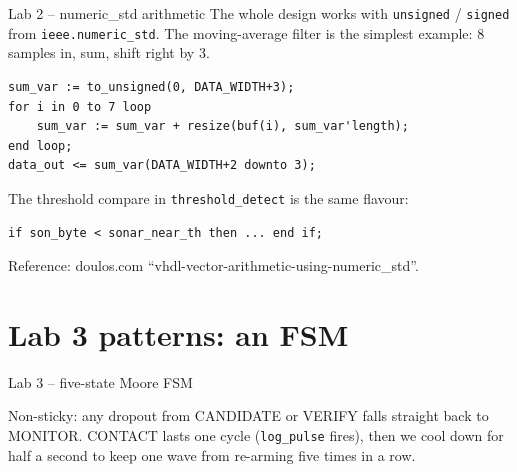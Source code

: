 \documentclass[aspectratio=169,10pt]{beamer}
\begin{document}
\begin{frame}[fragile]{Lab 2 -- numeric\_std arithmetic}
    The whole design works with \texttt{unsigned} / \texttt{signed}
    from \texttt{ieee.numeric\_std}. The moving-average filter is the
    simplest example: 8 samples in, sum, shift right by 3.
\begin{lstlisting}[style=vhdl]
sum_var := to_unsigned(0, DATA_WIDTH+3);
for i in 0 to 7 loop
    sum_var := sum_var + resize(buf(i), sum_var'length);
end loop;
data_out <= sum_var(DATA_WIDTH+2 downto 3);
\end{lstlisting}
    The threshold compare in \texttt{threshold\_detect} is the same
    flavour:
\begin{lstlisting}[style=vhdl]
if son_byte < sonar_near_th then ... end if;
\end{lstlisting}
    \scriptsize Reference: doulos.com ``vhdl-vector-arithmetic-using-numeric\_std''.
\end{frame}

\section{Lab 3 patterns: an FSM}

\begin{frame}{Lab 3 -- five-state Moore FSM}
    \centering

    \vspace{2mm}
    \scriptsize Non-sticky: any dropout from CANDIDATE or VERIFY falls
    straight back to MONITOR. CONTACT lasts one cycle (\texttt{log\_pulse}
    fires), then we cool down for half a second to keep one wave from
    re-arming five times in a row.
\end{frame}
\end{document}
